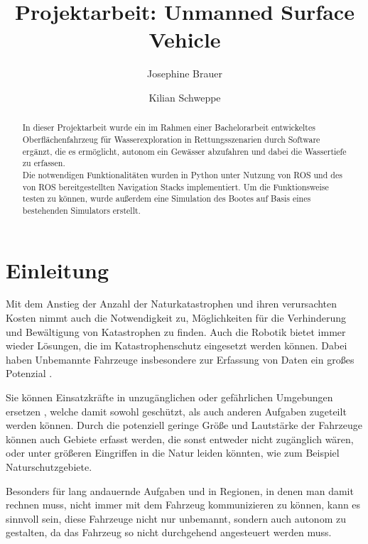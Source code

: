 \documentclass[conference]{IEEEtran}
\begin{document}
\title{Projektarbeit: Unmanned Surface Vehicle}

\author{Josephine Brauer \and Kilian Schweppe}

\maketitle

\begin{abstract}
In dieser Projektarbeit wurde ein im Rahmen einer Bachelorarbeit entwickeltes Oberflächenfahrzeug für Wasserexploration in Rettungsszenarien durch Software ergänzt, die es ermöglicht, autonom ein Gewässer abzufahren und dabei die Wassertiefe zu erfassen.\\
Die notwendigen Funktionalitäten wurden in Python unter Nutzung von ROS und des von ROS bereitgestellten Navigation Stacks implementiert. Um die Funktionsweise testen zu können, wurde außerdem eine Simulation des Bootes auf Basis eines bestehenden Simulators erstellt.\\
\end{abstract}

\section{Einleitung}
Mit dem Anstieg der Anzahl der Naturkatastrophen und ihren verursachten Kosten\cite{kellenberg} nimmt auch die Notwendigkeit zu, Möglichkeiten für die Verhinderung und Bewältigung von Katastrophen zu finden. Auch die Robotik bietet immer wieder Lösungen, die im Katastrophenschutz eingesetzt werden können. Dabei haben Unbemannte Fahrzeuge insbesondere zur Erfassung von Daten ein großes Potenzial \cite{surveyDisasterRobotics}.

Sie können Einsatzkräfte in unzugänglichen oder gefährlichen Umgebungen ersetzen \cite{bellingham}, welche damit sowohl geschützt, als auch anderen Aufgaben zugeteilt werden können. Durch die potenziell geringe Größe und Lautstärke der Fahrzeuge können auch Gebiete erfasst werden, die sonst entweder nicht zugänglich wären, oder unter größeren Eingriffen in die Natur leiden könnten, wie zum Beispiel Naturschutzgebiete.

Besonders für lang andauernde Aufgaben und in Regionen, in denen man damit rechnen muss, nicht immer mit dem Fahrzeug kommunizieren zu können, kann es sinnvoll sein, diese Fahrzeuge nicht nur unbemannt, sondern auch autonom zu gestalten, da das Fahrzeug so nicht durchgehend angesteuert werden muss.
\end{document}
